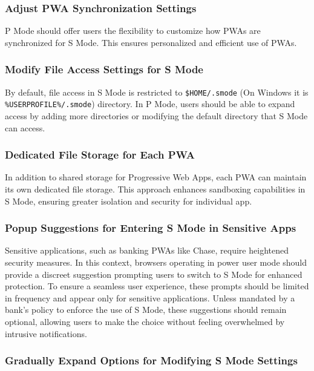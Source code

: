 \subsubsection{Adjust PWA Synchronization Settings}

P Mode should offer users the flexibility to customize how PWAs are synchronized for S Mode. This ensures personalized and efficient use of PWAs.

\subsubsection{Modify File Access Settings for S Mode}

By default, file access in S Mode is restricted to \texttt{\$HOME/.smode} (On Windows it is \texttt{\%USERPROFILE\%/.smode}) directory. In P Mode, users should be able to expand access by adding more directories or modifying the default directory that S Mode can access.

\subsubsection{Dedicated File Storage for Each PWA}

In addition to shared storage for Progressive Web Apps, each PWA can maintain its own dedicated file storage. This approach enhances sandboxing capabilities in S Mode, ensuring greater isolation and security for individual app.

\subsubsection{Popup Suggestions for Entering S Mode in Sensitive Apps}

Sensitive applications, such as banking PWAs like Chase, require heightened security measures. In this context, browsers operating in power user mode should provide a discreet suggestion prompting users to switch to S Mode for enhanced protection. To ensure a seamless user experience, these prompts should be limited in frequency and appear only for sensitive applications. Unless mandated by a bank's policy to enforce the use of S Mode, these suggestions should remain optional, allowing users to make the choice without feeling overwhelmed by intrusive notifications.

\subsubsection{Gradually Expand Options for Modifying S Mode Settings}

